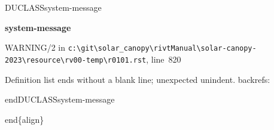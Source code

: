 \documentclass[12pt,notitle,letterpaper]{report}
\renewenvironment{quote}
{\small\list{}{\rightmargin=0cm \leftmargin=0cm}%
    \item\relax}
{\endlist}
\newenvironment{DUclass}[1]%
  {%
   \def\DocutilsClassFunctionName{DUCLASS#1}
     \csname \DocutilsClassFunctionName \endcsname}%
  {\csname end\DocutilsClassFunctionName \endcsname}%
\newenvironment{DUadmonition}%
  {\begin{center}
     \begin{lrbox}{\DUadmonitionbox}
       \begin{minipage}{0.9\linewidth}
  }%
  {    \end{minipage}
     \end{lrbox}
     \fbox{\usebox{\DUadmonitionbox}}
   \end{center}
  }
\providecommand*{\DUtitle}[1]{%
  \smallskip\noindent\textbf{#1}\smallskip}
\begin{document}
\begin{quote}
\begin{description}
\end{description}

\begin{DUclass}{system-message}
\begin{DUadmonition}
\DUtitle{system-message
}

{\color{red}WARNING/2} in \texttt{c:\textbackslash{}git\textbackslash{}solar\_canopy\textbackslash{}rivtManual\textbackslash{}solar-canopy-2023\textbackslash{}resource\textbackslash{}rv00-temp\textbackslash{}r0101.rst}, line~820

Definition list ends without a blank line; unexpected unindent.
backrefs: \end{DUadmonition}
\end{DUclass}

end\{align\}
\end{quote}
\end{document}
